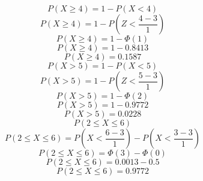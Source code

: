$$P(X\geq4)=1-P(X<4)$$
$$P(X\geq4)=1-P(Z<\frac{4-3}{1})$$
$$P(X\geq4)=1-\Phi(1)$$
$$P(X\geq4)=1-0.8413$$
$$P(X\geq4)=0.1587$$
$$P(X>5)=1-P(X<5)$$
$$P(X>5)=1-P(Z<\frac{5-3}{1})$$
$$P(X>5)=1-\Phi(2)$$
$$P(X>5)=1-0.9772$$
$$P(X>5)=0.0228$$
$$P(2\leq X \leq6)$$
$$P(2\leq X \leq6)=P(X<\frac{6-3}{1})-P(X<\frac{3-3}{1})$$
$$P(2\leq X \leq6)=\Phi(3)-\Phi(0)$$
$$P(2\leq X \leq6)=0.0013-0.5$$
$$P(2\leq X \leq6)=0.9772$$